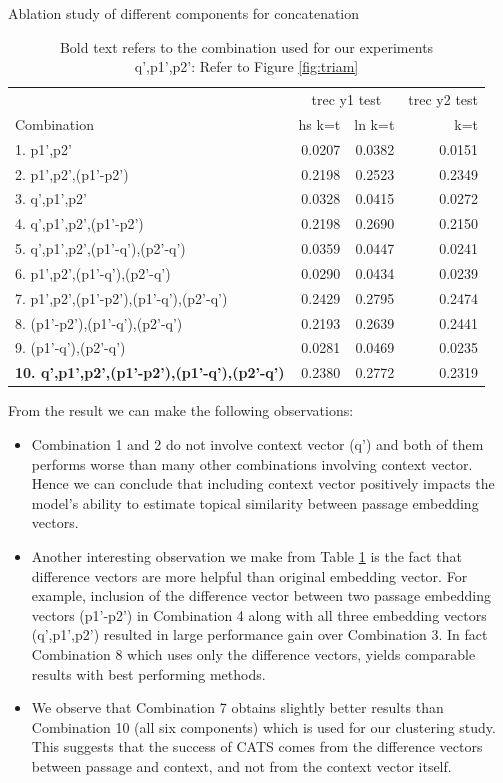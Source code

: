 \begin{small}
\begin{table}[t]
\centering
\caption{Ablation study of different components for concatenation}
\label{tab:abl}
\begin{tabular}{@{}lrrr@{}}\toprule
& \multicolumn{2}{c}{trec y1 test} & trec y2 test  \\
\cmidrule(r){2-3}
\cmidrule(r){4-4}
Combination & hs k=t & ln k=t & k=t \\\midrule
1. p1',p2' & 0.0207 & 0.0382 & 0.0151 \\ 
2. p1',p2',(p1'-p2') & 0.2198 & 0.2523 & 0.2349 \\
3. q',p1',p2' & 0.0328 & 0.0415 & 0.0272 \\
4. q',p1',p2',(p1'-p2') & 0.2198 & 0.2690 & 0.2150 \\
5. q',p1',p2',(p1'-q'),(p2'-q') & 0.0359 & 0.0447 & 0.0241 \\
6. p1',p2',(p1'-q'),(p2'-q') & 0.0290 & 0.0434 & 0.0239 \\
7. p1',p2',(p1'-p2'),(p1'-q'),(p2'-q') & 0.2429 & 0.2795 & 0.2474 \\
8. (p1'-p2'),(p1'-q'),(p2'-q') & 0.2193 & 0.2639 & 0.2441 \\
9. (p1'-q'),(p2'-q') & 0.0281 & 0.0469 & 0.0235 \\
\textbf{10. q',p1',p2',(p1'-p2'),(p1'-q'),(p2'-q')} & 0.2380 & 0.2772 & 0.2319 \\
\bottomrule
\end{tabular}
\caption*{Bold text refers to the combination used for our experiments \\
q',p1',p2': Refer to Figure \ref{fig:triam}}
\end{table}
\end{small}

From the result we can make the following observations:
\begin{itemize}[leftmargin=.15in]
    \item Combination 1 and 2 do not involve context vector (q') and both of them performs worse than many other combinations involving context vector. Hence we can conclude that including context vector positively impacts the model's ability to estimate topical similarity between passage embedding vectors.
    \item Another interesting observation we make from Table \ref{tab:abl} is the fact that difference vectors are more helpful than original embedding vector. For example, inclusion of the difference vector between two passage embedding vectors (p1'-p2') in Combination 4 along with all three embedding vectors (q',p1',p2') resulted in large performance gain over Combination 3. In fact Combination 8 which uses only the difference vectors, yields comparable results with best performing methods.
    \item We observe that Combination 7 obtains slightly better results than Combination 10 (all six components) which is used for our clustering study. This suggests that the success of CATS comes from the difference vectors between passage and context, and not from the context vector itself. 
\end{itemize}

